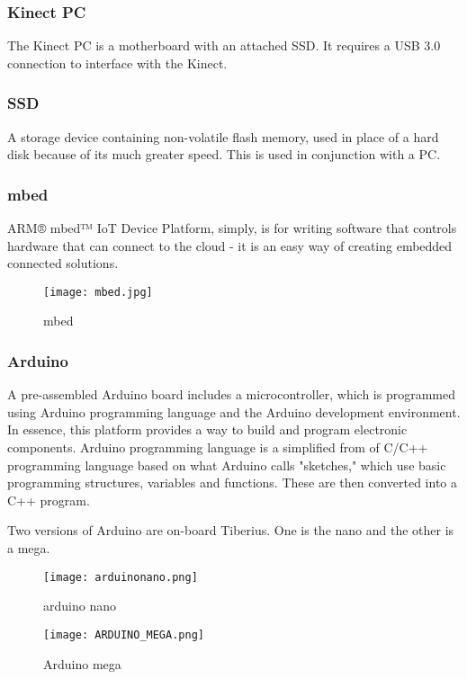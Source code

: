 \subsubsection{Kinect PC}
The Kinect PC is a motherboard with an attached SSD. It requires a USB 3.0 connection to interface with the Kinect. 

\subsubsection{SSD}
A storage device containing non-volatile flash memory, used in place of a hard disk because of its much greater speed. This is used in conjunction with a PC.

\subsubsection{mbed}
ARM® mbed™ IoT Device Platform, simply, is for writing software that controls hardware that can connect to the cloud - it is an easy way of creating embedded connected solutions.
\begin{figure}[!htb]
\begin{center}
\texttt{[image: mbed.jpg]}
\end{center}
\caption{mbed}
\label{fig:mbed}
\end{figure}

\subsubsection{Arduino}
A pre-assembled Arduino board includes a microcontroller, which is programmed using Arduino programming language and the Arduino development environment. In essence, this platform provides a way to build and program electronic components. Arduino programming language is a simplified from of C/C++ programming language based on what Arduino calls "sketches," which use basic programming structures, variables and functions. These are then converted into a C++ program. 

Two versions of Arduino are on-board Tiberius. One is the nano and the other is a mega.

\begin{figure}[!htb]
\begin{center}
\texttt{[image: arduinonano.png]}
\end{center}
\caption{arduino nano}
\label{fig:arduinoNano}
\end{figure}

\begin{figure}[!htb]
\begin{center}
\texttt{[image: ARDUINO\_MEGA.png]}
\end{center}
\caption{Arduino mega}
\label{fig:ArduinoMega}
\end{figure}


